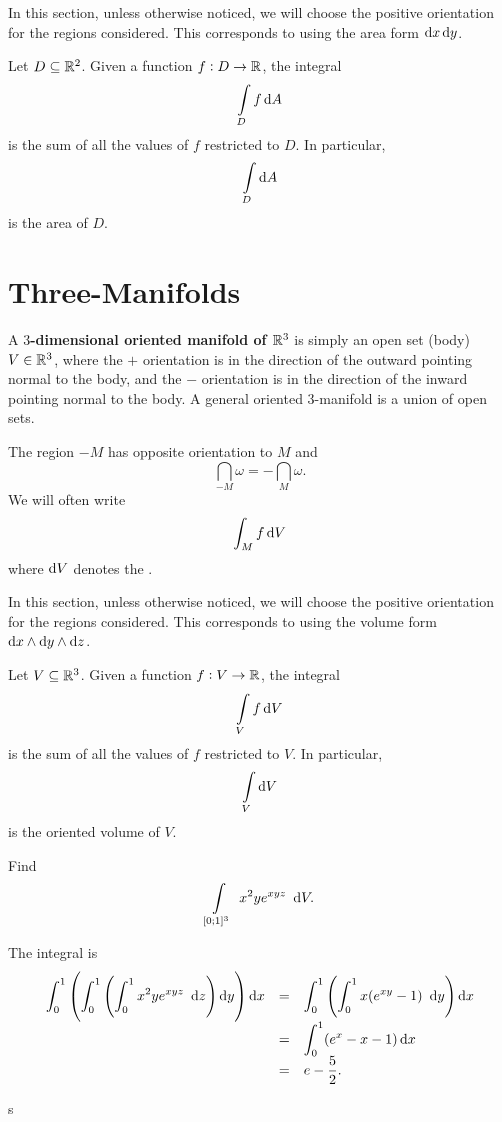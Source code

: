 \begin{rem}
In this section, unless otherwise noticed, we will choose the
positive orientation for the regions considered. This corresponds to
using the area form $\d{x} \d{y}$.
\end{rem}
Let $D \subseteq \mathbb{R}^2$. Given a function $f:D \rightarrow
\mathbb{R}$, the integral
$$\dint \limits_D f\d{A} $$is the sum of all the values of $f$ restricted to $D$. In particular,
$$\dint \limits_D \d{A}$$is the area of $D$.


\section{Three-Manifolds}
\begin{df}
A  \textbf{$3$-dimensional  oriented manifold of $\mathbb{R}^3$} is simply
an open set  (body) $V\in \mathbb{R}^3$, where the $+$ orientation is in
the direction of the outward pointing normal to the body, and
 the $-$ orientation is in the direction of the inward pointing  normal to the body. A general
oriented $3$-manifold is a union of open sets.
\end{df}
\begin{rem}The region $-M$ has opposite orientation to $M$ and
$$ \dint _{-M} \omega = -\dint _M \omega .   $$ We will often write
$$\dint _Mf\d{V} $$ where $\d{V}$ denotes the .
\end{rem}

\begin{rem}
In this section, unless otherwise noticed, we will choose the
positive orientation for the regions considered. This corresponds
to using the volume form $\d{x}\wedge \d{y}\wedge \d{z}$.
\end{rem}
Let $V \subseteq \mathbb{R}^3$. Given a function $f:V \rightarrow
\mathbb{R}$, the integral
$$\dint \limits_V f\d{V} $$is the sum of all the values of $f$ restricted to $V$. In particular,
$$\dint \limits_V \d{V} $$is the oriented volume of $V$.

\begin{exa}
Find $$\dint \limits_{[0;1]^3} \ x^2ye^{xyz} \ \d{V}.$$
\end{exa}
\begin{solu}The integral is
$$\begin{array}{lll}
\dint_0 ^1 \left(\dint_0 ^1 \left(\dint_0 ^1 x^2ye^{xyz}\
\d{z}\right)\d{y}\right) \d{x}& = & \dint_0 ^1 \left(\dint_0 ^1
x(e^{xy} - 1)\ \d{y}\right) \d{x}\\
& = & \dint_0 ^1 (e^x - x - 1) \d{x}\\
& = & e  - \dfrac{5}{2}.
\end{array}$$
\end{solu}
s


